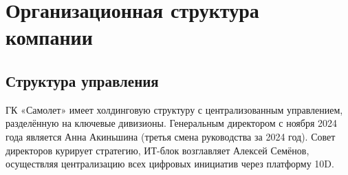 \documentclass[12pt,a4paper]{article}
\begin{document}
\newpage

\section{Организационная структура компании}

\subsection{Структура управления}

ГК «Самолет» имеет холдинговую структуру с централизованным управлением, разделённую на ключевые дивизионы. Генеральным директором с ноября 2024 года является Анна Акиньшина (третья смена руководства за 2024 год). Совет директоров курирует стратегию, ИТ-блок возглавляет Алексей Семёнов, осуществляя централизацию всех цифровых инициатив через платформу 10D.
\end{document}
